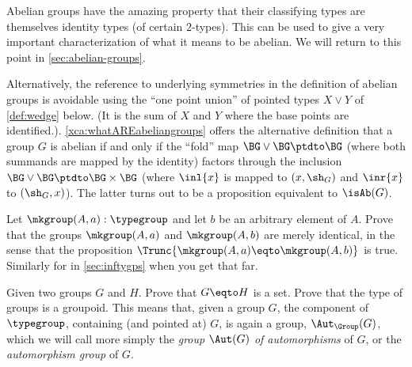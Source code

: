 \begin{remark}
  \label{rem:whatAREabeliangroups}

  Abelian groups have the amazing property that their classifying types are themselves identity types (of certain $2$-types).
  This can be used to give a very important characterization of what it means to be abelian.
  We will return to this point in \cref{sec:abelian-groups}.

  Alternatively, the reference to underlying symmetries in the definition of abelian groups is avoidable using the ``one point union'' of pointed types $X\vee Y$ of \cref{def:wedge} below. (It is the sum of $X$ and $Y$ where the base points are identified.). \cref{xca:whatAREabeliangroups}
offers the alternative definition that a group $G$ is abelian if and only if
the ``fold'' map $\BG\vee \BG\ptdto \BG$ (where both summands are mapped by
the identity) factors through the inclusion $\BG\vee\BG\ptdto\BG\times\BG$
(where $\inl{x}$ is mapped to $(x,\sh_G)$ and $\inr{x}$ to $(\sh_G,x)$).
The latter turns out to be a proposition equivalent to $\isAb(G)$.
\end{remark}

\begin{xca}
  Let $\mkgroup(A,a):\typegroup$ and let $b$ be an arbitrary element of $A$.
  Prove that the groups $\mkgroup(A,a)$ and $\mkgroup(A,b)$ are 
  merely identical, in the sense that the proposition
  $\Trunc{\mkgroup(A,a)\eqto\mkgroup(A,b)}$ is true.
  Similarly for \inftygps in \cref{sec:inftygps} when you get that far.
\end{xca}

  \begin{xca}\label{xca:typegroupisgroupoid}
    Given two groups $G$ and $H$.  Prove that $G\eqto H$ is a set.
    Prove that the type of groups is a groupoid.
    This means that, given a group $G$, the component of $\typegroup$,
    containing (and pointed at) $G$, is again a group, $\Aut_\Group(G)$,
    which we will call more simply the \emph{group $\Aut(G)$ of automorphisms}%
     of $G$,
    or the \emph{automorphism group} of $G$.
  \end{xca}

